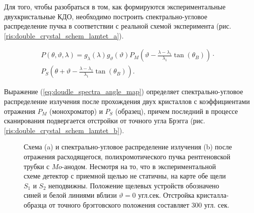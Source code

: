 
Для того, чтобы разобраться в том, как формируются экспериментальные
двухкристальные КДО, необходимо построить спектрально-угловое распределение пучка
в соответствии с реальной схемой эксперимента (рис. \ref{ris:double_crystal_schem_lamtet_a}).

\begin{eqnarray} \label{eq:doudle_spectra_angle_map}
  P(\theta,\vartheta,\lambda) = g_{\lambda}(\lambda)g_{\vartheta}(\vartheta) P_M \left(\vartheta - \frac{\lambda - \lambda_1}{\lambda_1}\tan(\theta_B) \right) \cdot \nonumber \\
   P_S \left(\theta + \vartheta - \frac{\lambda - \lambda_1}{\lambda_1}\tan(\theta_B)\right).
 \end{eqnarray}

Выражение (\ref{eq:doudle_spectra_angle_map}) определяет спектрально-угловое распределение излучения после прохождения двух кристаллов с
коэффициентами отражения  $P_M$ (монохроматор) и $P_S$ (образец), причем последний в процессе сканирования подвергается отстройки от точного угла Брэгга
 (рис. \ref{ris:double_crystal_schem_lamtet_b}).

\begin{figure}[H]
  \centering
  \hfill

  \caption{Схема (a) и спектрально-угловое распределение излучения (b) после
  отражения расходящегося, полихромотического пучка рентгеновской трубки с $Mo$-анодом.
  Несмотря на то, что в экспериментальной схеме детектор с приемной
   щелью не статичны, на карте обе щели $S_1$ и $S_2$ неподвижны.
  Положение щелевых устройств обозначено синей и белой линиями
  вблизи $\vartheta = 0$ угл.сек. Отстройка кристалла-образца от
  точного брэгговского положения составляет 300 угл. сек. }
  \label{ris:double_crystal_schem_lamtet}
\end{figure}

